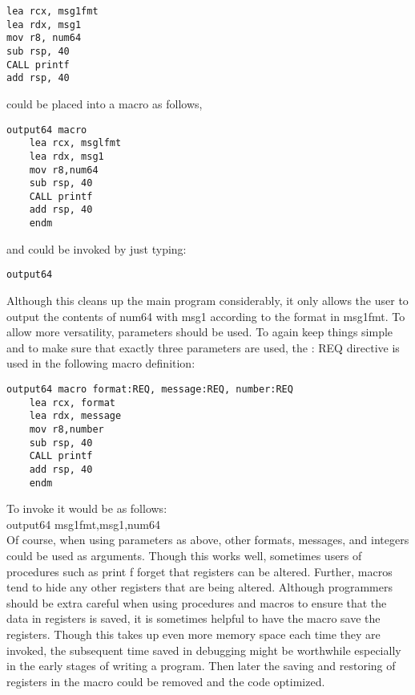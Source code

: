\documentclass[10pt]{article}
\begin{document}
\begin{verbatim}
lea rcx, msg1fmt
lea rdx, msg1
mov r8, num64
sub rsp, 40
CALL printf
add rsp, 40
\end{verbatim}

could be placed into a macro as follows,

\begin{verbatim}
output64 macro
    lea rcx, msglfmt
    lea rdx, msg1
    mov r8,num64
    sub rsp, 40
    CALL printf
    add rsp, 40
    endm
\end{verbatim}

and could be invoked by just typing:

\begin{verbatim}
output64
\end{verbatim}

Although this cleans up the main program considerably, it only allows the user to output the contents of num64 with msg1 according to the format in msg1fmt. To allow more versatility, parameters should be used. To again keep things simple and to make sure that exactly three parameters are used, the : REQ directive is used in the following macro definition:

\begin{verbatim}
output64 macro format:REQ, message:REQ, number:REQ
    lea rcx, format
    lea rdx, message
    mov r8,number
    sub rsp, 40
    CALL printf
    add rsp, 40
    endm
\end{verbatim}

To invoke it would be as follows:\\
output64 msg1fmt,msg1,num64\\
Of course, when using parameters as above, other formats, messages, and integers could be used as arguments. Though this works well, sometimes users of procedures such as print f forget that registers can be altered. Further, macros tend to hide any other registers that are being altered. Although programmers should be extra careful when using procedures and macros to ensure that the data in registers is saved, it is sometimes helpful to have the macro save the registers. Though this takes up even more memory space each time they are invoked, the subsequent time saved in debugging might be worthwhile especially in the early stages of writing a program. Then later the saving and restoring of registers in the macro could be removed and the code optimized.
\end{document}
